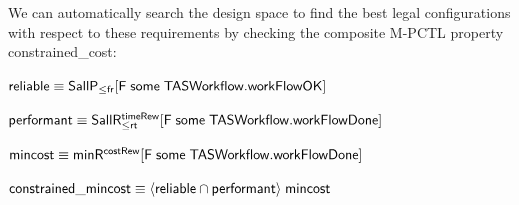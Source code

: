 \documentclass[10pt,journal,compsoc]{IEEEtran}
\begin{document}




We can automatically search the design space to find the best legal configurations with respect to these requirements by checking the composite M-PCTL property {\sf constrained\_cost}:

{\footnotesize
\smallskip
\centerline{${\sf reliable \equiv SallP_{\leq fr} [F \; some\; TASWorkflow.workFlowOK]}$}
\smallskip
\centerline{${\sf performant \equiv SallR^{timeRew}_{\leq rt} [F \; some\; TASWorkflow.workFlowDone]}$}
\smallskip
\centerline{${\sf mincost \equiv minR^{costRew} [F \; some\; TASWorkflow.workFlowDone]}$}
\smallskip
\centerline{${\sf constrained\_mincost \equiv \langle reliable \cap performant\rangle \; mincost}$}
\smallskip
}
\end{document}
